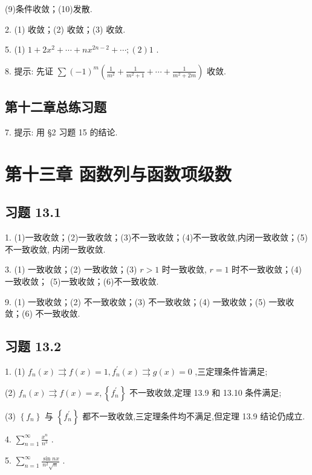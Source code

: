 (9)条件收敛；(10)发散.

2. (1) 收敛；(2) 收敛；(3) 收敛.

5. (1) \(1 + 2{x}^{2} + \cdots  + n{x}^{{2n} - 2} + \cdots ;\left( 2\right) 1\) .

8. 提示: 先证 \(\sum {\left( -1\right) }^{m}\left( {\frac{1}{{m}^{2}} + \frac{1}{{m}^{2} + 1} + \cdots  + \frac{1}{{m}^{2} + {2m}}}\right)\) 收敛.

\subsection{第十二章总练习题}

7. 提示: 用 §2 习题 15 的结论.

\section{第十三章 函数列与函数项级数}

\subsection{习题 13.1}

1. (1)一致收敛；(2)一致收敛；(3)不一致收敛；(4)不一致收敛,内闭一致收敛；(5)不一致收敛, 内闭一致收敛.

3. (1) 一致收敛；(2) 一致收敛；(3) \(r > 1\) 时一致收敛, \(r = 1\) 时不一致收敛；(4) 一致收敛； (5)一致收敛；(6)不一致收敛.

9. (1) 一致收敛；(2) 不一致收敛；(3) 不一致收敛；(4) 一致收敛；(5) 一致收敛；(6) 不一致收敛.

\subsection{习题 13.2}

1. (1) \({f}_{n}\left( x\right)  \rightrightarrows  f\left( x\right)  = 1,{f}_{n}^{\prime }\left( x\right)  \rightrightarrows  g\left( x\right)  = 0\) ,三定理条件皆满足;

(2) \({f}_{n}\left( x\right)  \rightrightarrows  f\left( x\right)  = x,\left\{  {f}_{n}^{\prime }\right\}\) 不一致收敛,定理 13.9 和 13.10 条件满足;

(3) \(\left\{  {f}_{n}\right\}\) 与 \(\left\{  {f}_{n}^{\prime }\right\}\) 都不一致收敛,三定理条件均不满足,但定理 13.9 结论仍成立.

4. \(\mathop{\sum }\limits_{{n = 1}}^{\infty }\frac{{x}^{n}}{{n}^{3}}\) .

5. \(\mathop{\sum }\limits_{{n = 1}}^{\infty }\frac{\sin {nx}}{{n}^{2}\sqrt{n}}\) .

